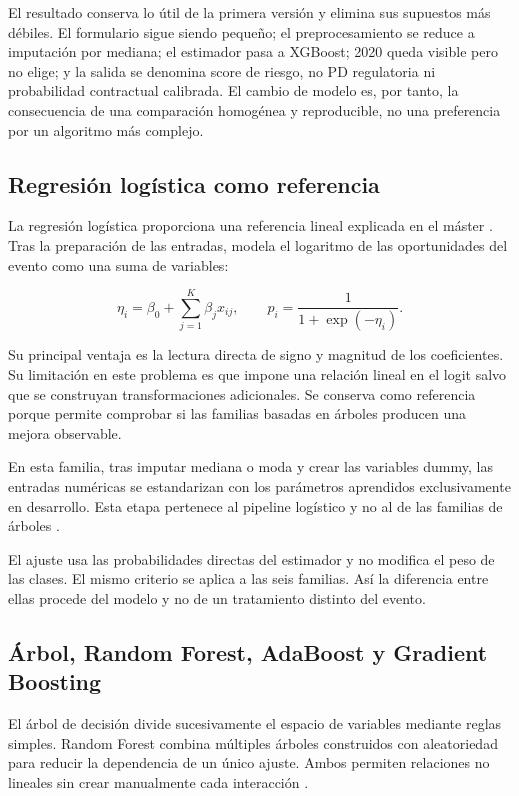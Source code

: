 \documentclass[10pt,a4paper]{article}
\begin{document}
El resultado conserva lo útil de la primera versión y elimina sus supuestos más
débiles. El formulario sigue siendo pequeño; el preprocesamiento se reduce a
imputación por mediana; el estimador pasa a XGBoost; 2020 queda visible pero no
elige; y la salida se denomina score de riesgo, no PD regulatoria ni probabilidad
contractual calibrada. El cambio de modelo es, por tanto, la consecuencia de una
comparación homogénea y reproducible, no una preferencia por un algoritmo más
complejo.

\subsection{Regresión logística como referencia}

La regresión logística proporciona una referencia lineal explicada en el
máster \cite{logistica,scoring}. Tras la preparación de las entradas, modela el
logaritmo de las oportunidades del evento como una suma de variables:

\[
\eta_i=\beta_0+\sum_{j=1}^{K}\beta_j x_{ij},
\qquad
\widehat{p}_i=\frac{1}{1+\exp(-\eta_i)}.
\]

Su principal ventaja es la lectura directa de signo y magnitud de los
coeficientes. Su limitación en este problema es que impone una relación lineal
en el logit salvo que se construyan transformaciones adicionales. Se conserva
como referencia porque permite comprobar si las familias basadas en árboles
producen una mejora observable.

En esta familia, tras imputar mediana o moda y crear las variables dummy, las
entradas numéricas se estandarizan con los parámetros aprendidos exclusivamente
en desarrollo. Esta etapa pertenece al pipeline logístico y no al de las
familias de árboles
\cite[pp.~71 y 76--77]{spark}.

El ajuste usa las probabilidades directas del estimador y no modifica el peso
de las clases. El mismo criterio se aplica a las seis familias. Así la diferencia
entre ellas procede del modelo y no de un tratamiento distinto del evento.

\subsection{Árbol, Random Forest, AdaBoost y Gradient Boosting}

El árbol de decisión divide sucesivamente el espacio de variables mediante
reglas simples. Random Forest combina múltiples árboles construidos con
aleatoriedad para reducir la dependencia de un único ajuste. Ambos permiten
relaciones no lineales sin crear manualmente cada interacción
\cite{clasificadores}.
\end{document}
